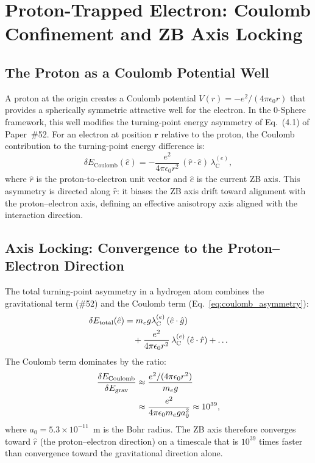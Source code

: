 \documentclass[%
 reprint, amsmath,amssymb, aps, prd, ]{revtex4-2}
\numberwithin{equation}{section}
\newcommand{\lambdaCe}{\lambda_{\mathrm{C}}^{(e)}}
\begin{document}
\section{Proton-Trapped Electron: Coulomb Confinement and ZB Axis Locking}
\label{sec:trapped}

\subsection{The Proton as a Coulomb Potential Well}

A proton at the origin creates a Coulomb potential $V(r) = -e^2/(4\pi\epsilon_0 r)$ that provides a spherically symmetric attractive well for the electron.
In the 0-Sphere framework, this well modifies the turning-point energy asymmetry of Eq.~(4.1) of Paper~\#52.
For an electron at position $\mathbf{r}$ relative to the proton, the Coulomb contribution to the turning-point energy difference is:
\begin{equation}
\delta E_\mathrm{Coulomb}(\hat{e})
= -\frac{e^2}{4\pi\epsilon_0 r^2}\,(\hat{r}\cdot\hat{e})\,\lambdaCe,
\label{eq:coulomb_asymmetry}
\end{equation}
where $\hat{r}$ is the proton-to-electron unit vector and $\hat{e}$ is the current ZB axis.
This asymmetry is directed along $\hat{r}$: it biases the ZB axis drift toward alignment with the proton--electron axis, defining an effective anisotropy axis aligned with the interaction direction.

\subsection{Axis Locking: Convergence to the Proton--Electron Direction}

The total turning-point asymmetry in a hydrogen atom combines the gravitational term (\#52) and the Coulomb term (Eq.~\eqref{eq:coulomb_asymmetry}):
\begin{align}
\delta E_\mathrm{total}(\hat{e})
&= m_e g \lambdaCe\,(\hat{e}\cdot\hat{g})
\notag\\
&\quad + \frac{e^2}{4\pi\epsilon_0 r^2}\,\lambdaCe\,(\hat{e}\cdot\hat{r})
+ \ldots
\label{eq:total_asymmetry}
\end{align}
The Coulomb term dominates by the ratio:
\begin{align}
\frac{\delta E_\mathrm{Coulomb}}{\delta E_\mathrm{grav}}
&\approx \frac{e^2/(4\pi\epsilon_0 r^2)}{m_e g}
\notag\\
&\approx \frac{e^2}{4\pi\epsilon_0 m_e g a_0^2}
\approx 10^{39},
\label{eq:coulomb_grav_ratio}
\end{align}
where $a_0 = 5.3\times10^{-11}$~m is the Bohr radius.
The ZB axis therefore converges toward $\hat{r}$ (the proton--electron direction) on a timescale that is $10^{39}$ times faster than convergence toward the gravitational direction alone.
\end{document}
